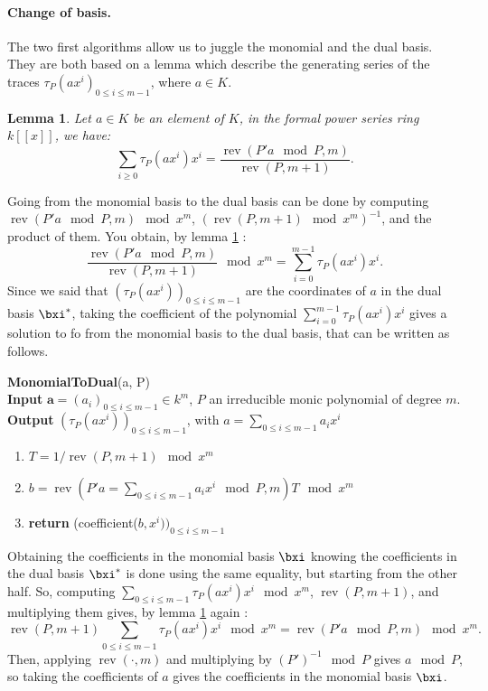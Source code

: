 \documentclass[a4paper,11pt]{article}
\theoremstyle{break}
\newtheorem{lm}[thm]{Lemma}
\theoremstyle{definition}
\theoremstyle{remark}
\DeclareMathOperator{\rev}{rev}
\begin{document}
\paragraph{Change of basis.}The two
first algorithms allow us to juggle the monomial and the dual basis. They are
both based on a lemma which describe the generating series of the traces
$\tau_P(ax^i)_{0\leq i \leq m-1}$, where $a\in K$. 
\begin{lm}
  \label{lm-basis}
  Let $a\in K$ be an element of $K$, in the formal power series ring $k[[x]]$,
  we have:
  \[
    \sum_{i\geq 0}\tau_P(ax^i)x^i=\frac{\rev(P'a\mod P,m)}{\rev(P,m+1)}.
  \]
\end{lm}
Going from the monomial basis to the dual basis can be done by computing
$\rev(P'a\mod P,m)\mod x^m$, $(\rev(P,m+1)\mod x^m)^{-1}$, and the product of
them. You obtain, by lemma \ref{lm-basis} :
\[
  \frac{\rev(P'a\mod P,m)}{\rev(P,m+1)}\mod x^m=\sum_{i=0}^{m-1}\tau_P(ax^i)x^i.
\]
Since we said that
$(\tau_P(ax^i))_{0\leq i \leq m-1}$ are the coordinates of $a$ in the dual basis
$\bxi^*$, taking the coefficient of the polynomial
$\sum_{i=0}^{m-1}\tau_P(ax^i)x^i$ gives a solution to fo from the monomial basis
to the dual basis, that can be written as follows.
\newline

\textbf{MonomialToDual}(a, P)\\
\textbf{Input} $\textbf{a}=(a_i)_{0\leq i\leq m-1}\in k^m$, $P$ an irreducible
monic polynomial of degree $m$.\\
\textbf{Output} $(\tau_P(ax^i))_{0\leq i \leq m-1}$, with $a=\sum_{0\leq i
\leq m-1}a_ix^i$
\begin{enumerate}
  \item $T=1/\rev(P,m+1) \mod x^m$
  \item $b=\rev(P'a=\sum_{0\leq i\leq m-1}a_ix^i \mod P,m)T\mod x^m$
  \item \textbf{return} (coefficient($b,x^i))_{0\leq i \leq m-1}$
\end{enumerate}

Obtaining the coefficients in the monomial basis $\bxi$
knowing the coefficients in the dual basis $\bxi^*$ is done using the same
equality, but starting from the other half. So, computing $\sum_{0\leq i \leq
m-1}\tau_P(ax^i)x^i \mod x^m$, $\rev(P,m+1)$, and multiplying them gives, by
lemma \ref{lm-basis} again : 
\[
\rev(P,m+1)\sum_{0\leq i \leq m-1}\tau_P(ax^i)x^i \mod x^m = \rev(P'a\mod P,m) 
\mod x^m.
\]
Then, applying $\rev(\cdot,m)$ and multiplying by $(P')^{-1}\mod P$ gives $a\mod
P$, so taking the coefficients of $a$ gives the coefficients in the monomial
basis $\bxi$.
\newline
\end{document}
